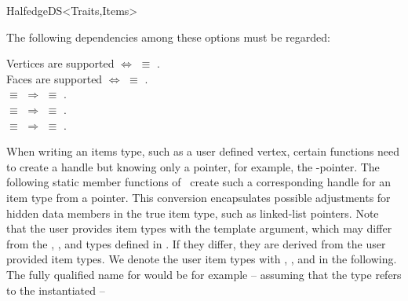 \begin{ccRefConcept}{HalfedgeDS<Traits,Items>}
\begin{ccAdvanced}
\ccGlue
{}
\ccGlue
{}
\ccGlue
{}
\ccGlue
{}
\ccGlue
{}

The following dependencies among these options must be regarded:

Vertices are supported $\Longleftrightarrow$
 $\equiv$ .
\\
Faces are supported $\Longleftrightarrow$
 $\equiv$ .
\\
 $\equiv$  $\Longrightarrow$
 $\equiv$ .
\\
 $\equiv$  $\Longrightarrow$
 $\equiv$ .
\\
 $\equiv$  $\Longrightarrow$
 $\equiv$ .


\end{ccAdvanced}

\begin{ccAdvanced}

When writing an items type, such as a user defined vertex, certain
functions need to create a handle but knowing only a pointer, for
example, the -pointer. The following static member functions
of \ccRefName\ create such a corresponding handle for an item type
from a pointer. This conversion encapsulates possible adjustments for
hidden data members in the true item type, such as linked-list
pointers. Note that the user provides item types with the
 template argument, which may differ from the ,
, and  types defined in \ccRefName. If they 
differ, they are derived from the user provided item types. We denote the
user item types with , , and
 in the following. The fully qualified name for 
 would be for example -- assuming that the type 
refers to the instantiated  --


\end{ccAdvanced}
\end{ccRefConcept}
